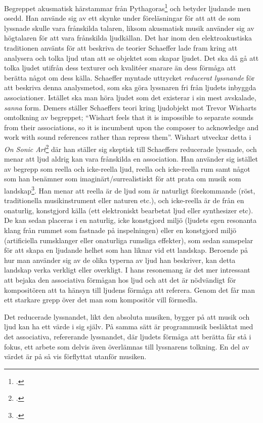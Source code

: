 \documentclass{article}
\begin{document}
Begreppet akusmatisk härstammar från Pythagoras\footcite{oxford} och betyder ljudande men osedd. Han använde
sig av ett skynke under föreläsningar för att att de som lyssnade skulle vara frånskilda talaren, liksom
akusmatisk musik använder sig av högtalaren för att vara frånskilda ljudkällan. Det har inom den
elektroakustiska traditionen använts för att beskriva de teorier Schaeffer lade fram kring att analysera och
tolka ljud utan att se objektet som skapar ljudet. Det ska då gå att tolka ljudet utifrån dess texturer och
kvalitéer snarare än dess förmåga att berätta något om dess källa. Schaeffer myntade uttrycket \emph{reducerat
lyssnande} för att beskriva denna analysmetod, som ska göra lyssnaren fri från ljudets inbyggda associationer.
Istället ska man höra ljudet som det existerar i sin mest avskalade, \emph{sanna} form. Demers ställer
Schaeffers teori kring ljudobjekt mot Trevor Wisharts omtolkning av begreppet; ``Wishart feels that it is
impossible to separate sounds from their associations, so it is incumbent upon the composer to acknowledge and
work with sound references rather than repress them''. Wishart utveckar detta i \emph{On Sonic
Art}\footcite{TrevorWishart} där han ställer sig skeptisk till Schaeffers reducerade lyssnade, och menar att
ljud aldrig kan vara frånskilda en association. Han använder sig istället av begrepp som reella och
icke-reella ljud, reella och icke-reella rum samt något som han benämner som imaginärt/surrealistiskt för att
prata om musik som landskap\footcite[144-147]{TrevorWishart}. Han menar att reella är de ljud som är naturligt
förekommande (röst, traditionella musikinstrument eller naturen etc.), och icke-reella är de från en
onaturlig, konstgjord källa (ett elektroniskt bearbetat ljud eller synthesizer etc). De kan sedan placeras i
en naturlig, icke konstgjord miljö (ljudets egen resonanta klang från rummet som fastnade på inspelningen)
eller en konstgjord miljö (artificiella rumsklanger eller onaturliga rumsliga effekter), som sedan samspelar
för att skapa en ljudande helhet som han liknar vid ett landskap. Beroende på hur man använder sig av de olika
typerna av ljud han beskriver, kan detta landskap verka verkligt eller overkligt. I hans resonemang är det mer
intressant att bejaka den associativa förmågan hos ljud och att det är nödvändigt för kompositören att ta
hänsyn till ljudens förmåga att referera. Genom det får man ett starkare grepp över det man som kompositör
vill förmedla.

Det reducerade lyssnandet, likt den absoluta musiken, bygger på att musik och ljud kan ha ett värde i sig
själv. På samma sätt är programmusik besläktat med det associativa, refererande lyssnandet, där ljudets
förmåga att berätta får stå i fokus, ett arbete som delvis även överlämnas till lyssnarens tolkning. En del av
värdet är på så vis förflyttat utanför musiken.
\end{document}
